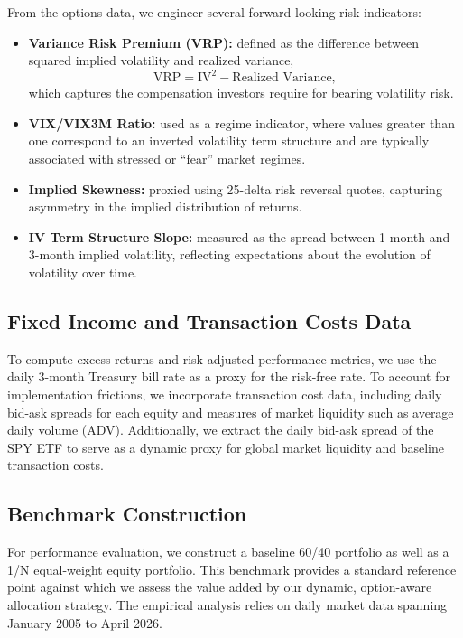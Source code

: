 \documentclass[12pt]{article}
\begin{document}
From the options data, we engineer several forward-looking risk indicators:
\begin{itemize}
    \item \textbf{Variance Risk Premium (VRP):} defined as the difference between squared implied volatility and realized variance,
    \[
    \text{VRP} = \text{IV}^2 - \text{Realized Variance},
    \]
    which captures the compensation investors require for bearing volatility risk.
    
    \item \textbf{VIX/VIX3M Ratio:} used as a regime indicator, where values greater than one correspond to an inverted volatility term structure and are typically associated with stressed or ``fear'' market regimes.
    
    \item \textbf{Implied Skewness:} proxied using 25-delta risk reversal quotes, capturing asymmetry in the implied distribution of returns.
    
    \item \textbf{IV Term Structure Slope:} measured as the spread between 1-month and 3-month implied volatility, reflecting expectations about the evolution of volatility over time.
\end{itemize}

\subsection{Fixed Income and Transaction Costs Data}

To compute excess returns and risk-adjusted performance metrics, we use the daily 3-month Treasury bill rate as a proxy for the risk-free rate. To account for implementation frictions, we incorporate transaction cost data, including daily bid-ask spreads for each equity and measures of market liquidity such as average daily volume (ADV). Additionally, we extract the daily bid-ask spread of the SPY ETF to serve as a dynamic proxy for global market liquidity and baseline transaction costs.

\subsection{Benchmark Construction}

For performance evaluation, we construct a baseline 60/40 portfolio as well as a 1/N equal-weight equity portfolio. This benchmark provides a standard reference point against which we assess the value added by our dynamic, option-aware allocation strategy.
The empirical analysis relies on daily market data spanning January 2005 to April 2026.
\end{document}
